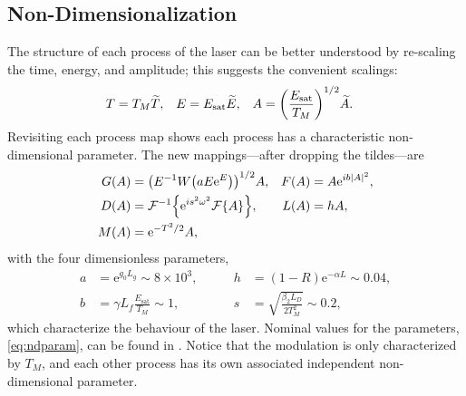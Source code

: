 \documentclass[10pt,twocolumn,a4paper]{article}
\let\originalleft\left
\let\originalright\right
\renewcommand{\left}{\mathopen{}\mathclose\bgroup\originalleft}
\renewcommand{\right}{\aftergroup\egroup\originalright}
\newcommand{\Es}{E_{\textrm{sat}}}
\newcommand{\FT}[1]{\mathcal{F}\left\{ #1 \right\}}
\newcommand{\FTi}[1]{\mathcal{F}^{-1}\left\{ #1 \right\}}
\begin{document}
\subsection{Non-Dimensionalization}
The structure of each process of the laser can be better understood by re-scaling the time, energy, and amplitude; this suggests the convenient scalings:
\begin{align}
	T &= T_M \widetilde{T},& E &= \Es \widetilde{E},& A &= \left( \frac{\Es}{T_M} \right)^{1/2} \widetilde{A}.
\end{align}
Revisiting each process map shows each process has a characteristic non-dimensional parameter. The new mappings---after dropping the tildes---are
\begin{equation}
	\begin{aligned}
		G(A) &= \left(E^{-1} W \left( a E \textrm{e}^{E}\right) \right)^{1/2} A, & F(A) &= A \textrm{e}^{i b |A|^2}, \\
		D(A) &= \FTi{\textrm{e}^{i s^2 \omega^2} \FT{A}}, & L(A) &= h A, \\
		M(A) &= \textrm{e}^{-T^2 / 2} A,
		\label{eq:effects}
	\end{aligned}
\end{equation}
with the four dimensionless parameters,
\begin{equation}
	\begin{aligned}
		a &= \textrm{e}^{g_0 L_g} \sim 8 \times 10^3,& \qquad h &= (1 - R) \textrm{e}^{-\alpha L} \sim 0.04, \\
		b &= \gamma L_f \frac{\Es}{T_M} \sim 1,& \qquad s &= \sqrt{\frac{\beta_2 L_D}{2 T_M^2}} \sim 0.2,
		\label{eq:ndparam}
	\end{aligned}
\end{equation}
which characterize the behaviour of the laser. Nominal values for the parameters, \eqref{eq:ndparam}, can be found in \cite{agrawal2002, agrawal2013, bohun2015, burgoyne2014, burgoyneemail, finot2008, li1998, litchinitser1997, peng2018, shtyrina2017, tamura1993, tamura1996, tomlinson1984, usechak2005, yamashita2009, yarutkina2013}. Notice that the modulation is only characterized by $T_M$, and each other process has its own associated independent non-dimensional parameter.
\end{document}
